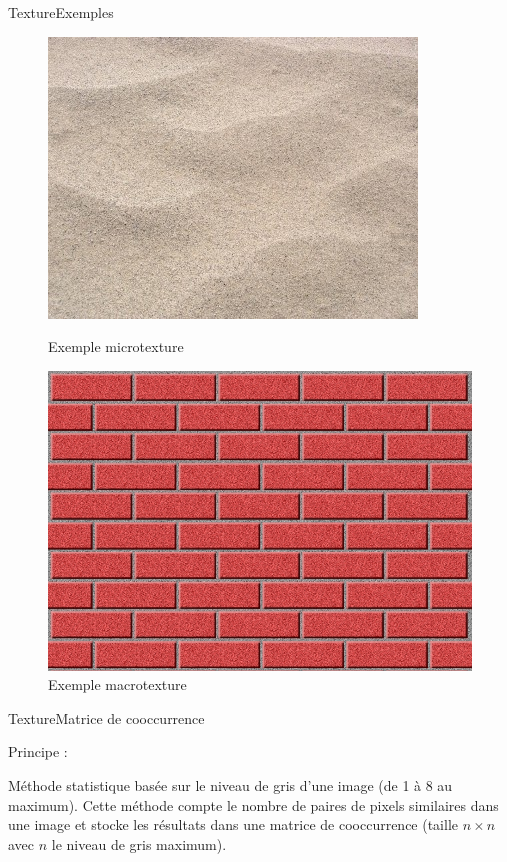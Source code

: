 \begin{frame}{Texture}{Exemples}

\begin{figure}
   \begin{minipage}[c]{.46\linewidth}
	  \centering
      \includegraphics[scale=0.32]{images/sable.jpg}
      \caption{Exemple microtexture}
   \end{minipage} \hfill
   \begin{minipage}[c]{.46\linewidth}
      \centering
      \includegraphics[scale=0.16]{images/briques.jpg}
      \caption{Exemple macrotexture}
   \end{minipage}
\end{figure}

\end{frame}


\begin{frame}{Texture}{Matrice de cooccurrence}

\begin{block}{Principe :}

Méthode statistique basée sur le niveau de gris d'une image (de 1 à 8 au maximum). Cette méthode compte le nombre de paires de pixels similaires dans une image et stocke les résultats dans une matrice de cooccurrence (taille $n \times n$ avec $n$ le niveau de gris maximum).

\end{block}

\end{frame}

